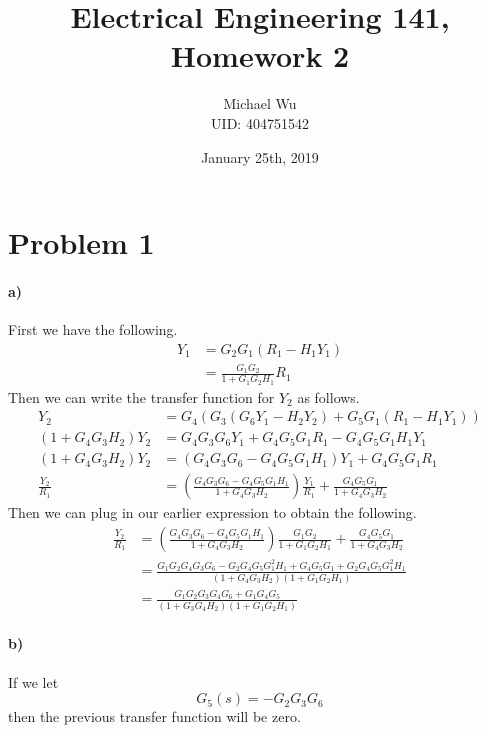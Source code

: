 \documentclass[12pt]{article}
\begin{document}
\title{Electrical Engineering 141, Homework 2}
\date{January 25th, 2019}
\author{Michael Wu\\UID: 404751542}
\maketitle

\section*{Problem 1}

\paragraph{a)}

First we have the following.
\begin{align*}
    Y_1 &= G_2G_1(R_1 - H_1Y_1)\\
    &=\frac{G_1G_2}{1+G_1G_2H_1}R_1
\end{align*}
Then we can write the transfer function for \(Y_2\) as follows.
\begin{align*}
    Y_2 &= G_4(G_3(G_6Y_1-H_2Y_2)+ G_5G_1(R_1-H_1Y_1))\\
    (1+G_4G_3H_2)Y_2&=G_4G_3G_6Y_1+ G_4G_5G_1R_1-G_4G_5G_1H_1Y_1\\
    (1+G_4G_3H_2)Y_2&=(G_4G_3G_6-G_4G_5G_1H_1)Y_1+ G_4G_5G_1R_1\\
    \frac{Y_2}{R_1}&=\left(\frac{G_4G_3G_6-G_4G_5G_1H_1}{1+G_4G_3H_2}\right)\frac{Y_1}{R_1} + \frac{G_4G_5G_1}{1+G_4G_3H_2}
\end{align*}
Then we can plug in our earlier expression to obtain the following.
\begin{align*}
    \frac{Y_2}{R_1}&=\left(\frac{G_4G_3G_6-G_4G_5G_1H_1}{1+G_4G_3H_2}\right)\frac{G_1G_2}{1+G_1G_2H_1}+\frac{G_4G_5G_1}{1+G_4G_3H_2}\\
    &=\frac{G_1G_2G_4G_3G_6-G_2G_4G_5G_1^2H_1 + G_4G_5G_1 + G_2G_4G_5G_1^2H_1}{(1+G_4G_3H_2)(1+G_1G_2H_1)}\\
    &=\frac{G_1G_2G_3G_4G_6 + G_1G_4G_5}{(1+G_3G_4H_2)(1+G_1G_2H_1)}
\end{align*}

\paragraph{b)}

If we let
\[G_5(s)=-G_2G_3G_6\]
then the previous transfer function will be zero.
\end{document}
